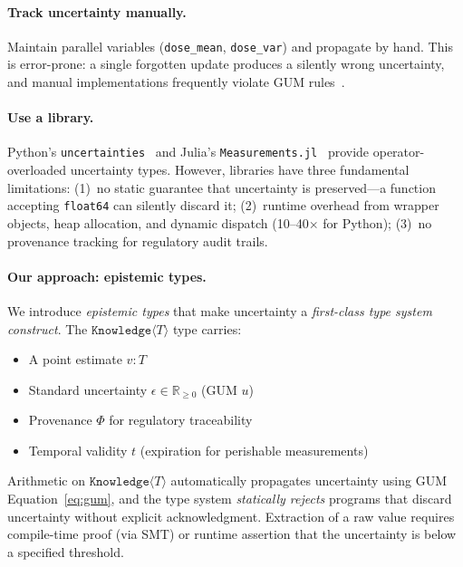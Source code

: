 \documentclass[acmsmall,screen,review,anonymous]{acmart}
\newcommand{\know}[1]{\texttt{Knowledge}\langle #1 \rangle}
\begin{document}
\paragraph{Track uncertainty manually.}
Maintain parallel variables (\texttt{dose\_mean}, \texttt{dose\_var})
and propagate by hand.
This is error-prone: a single forgotten update produces a silently
wrong uncertainty, and manual implementations frequently violate
GUM rules~\cite{jcgm2008supplement1}.

\paragraph{Use a library.}
Python's \texttt{uncertainties}~\cite{lebigot2024uncertainties} and
Julia's \texttt{Measurements.jl}~\cite{giordano2016measurements} provide
operator-overloaded uncertainty types.
However, libraries have three fundamental limitations:
(1)~no static guarantee that uncertainty is preserved---a function
accepting \texttt{float64} can silently discard it;
(2)~runtime overhead from wrapper objects, heap allocation, and
dynamic dispatch (10--40$\times$ for Python);
(3)~no provenance tracking for regulatory audit trails.

\paragraph{Our approach: epistemic types.}
We introduce \emph{epistemic types} that make uncertainty a
\emph{first-class type system construct}.
The $\know{T}$ type carries:
\begin{itemize}
  \item A point estimate $v : T$
  \item Standard uncertainty $\epsilon \in \mathbb{R}_{\geq 0}$ (GUM $u$)
  \item Provenance $\Phi$ for regulatory traceability
  \item Temporal validity $t$ (expiration for perishable measurements)
\end{itemize}

Arithmetic on $\know{T}$ automatically propagates uncertainty
using GUM Equation~\eqref{eq:gum}, and the type system \emph{statically
rejects} programs that discard uncertainty without explicit acknowledgment.
Extraction of a raw value requires compile-time proof (via SMT) or
runtime assertion that the uncertainty is below a specified threshold.
\end{document}
